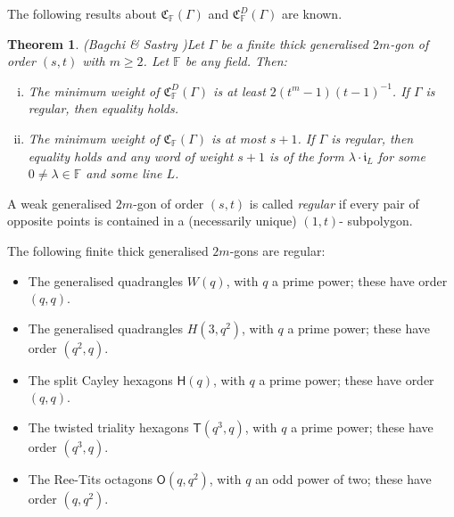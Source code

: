 \documentclass[12pt]{article}
\newcommand{\F}{\mathbb{F}}
\newcommand{\Points}{\mathcal{P}}
\newcommand{\FP}{\F\Points}
\newcommand{\Code}{\mathfrak{C}_\F}
\renewcommand{\i}{\mathfrak{i}}
\newtheorem{theorem}{Theorem}
\theoremstyle{remark}
\begin{document}


The following results about \(\Code(\Gamma)\) and \(\Code^D(\Gamma)\) are known. 
\begin{theorem}(Bagchi \& Sastry \cite{BandS})\label{BS}
	Let \(\Gamma\) be a finite thick generalised \(2m\)-gon of order \((s,t)\) with \(m\ge2\). Let \(\F\) be any field. Then:
	\begin{enumerate}[(i)]
		\item The minimum weight of \(\Code^D(\Gamma)\) is at least \(2(t^m-1)(t-1)^{-1}\). 
		If \(\Gamma\) is \emph{regular}, then equality holds.
		\item The minimum weight of \(\Code(\Gamma)\) is at most \(s+1\). If \(\Gamma\) is \emph{regular}, then equality holds and any word of weight \(s+1\) is of the form \(\lambda\cdot\i_L\) for some \(0\neq\lambda\in \F\) and some line \(L\).
	\end{enumerate}
\end{theorem}

A weak generalised $2m$-gon of order $(s,t)$ is called {\em regular} if every pair of opposite points is contained in a (necessarily unique) $(1,t)$- subpolygon.


The following finite thick generalised \(2m\)-gons are regular:
\begin{itemize}
	\item The generalised quadrangles \(W(q)\), with \(q\) a prime power; these have order $(q,q)$.
	\item The generalised quadrangles \(H(3,q^2)\), with \(q\) a prime power; these have order $(q^2,q)$.
	\item The split Cayley hexagons \(\mathsf{H}(q)\), with \(q\) a prime power; these have order $(q,q)$.
	\item The twisted triality hexagons \(\mathsf{T}(q^3,q)\), with \(q\) a prime power; these have order $(q^3,q).$
	\item The Ree-Tits octagons \(\mathsf{O}(q,q^2)\), with \(q\) an odd power of two; these have order $(q,q^2).$
\end{itemize}
\end{document}
